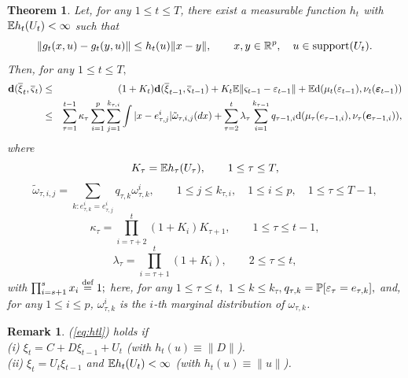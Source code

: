 \documentclass{article}              %
\newtheorem{theorem}{Theorem}
\newtheorem{remark}{Remark}
\begin{document}
\begin{theorem}
\label{prop:est} Let, for any $1\leq t\leq T$, there exist a measurable
function $h_{t}$ with $\E h_{t}(U_{t})<\infty$ such that 
\begin{equation}
\|g_{t}(x,u)-g_{t}(y,u)\|\leq h_{t}(u)\|x-y\|,\qquad
x,y\in\R^{p},\quad u\in\supp(U_{t}).\label{eq:htl}
\end{equation}
Then, for any $1\leq t\leq T,$ 
\begin{eqnarray}
\d(\barxi_{t},\barvs_{t}) & \leq & (1+K_{t})\d(\barxi_{t-1},\barvs_{t-1})+K_{t}\E\|\varsigma_{t-1}-\varepsilon_{t-1}\|+\E\dw(\mu_{t}(\varepsilon_{t-1}),\nu_{t}(\boldsymbol{\varepsilon}_{t-1}))\label{eq:dfirst}\\
 & \leq & \sum_{\tau=1}^{t-1}\kappa_{\tau}\sum_{i=1}^{p}\sum_{j=1}^{k_{\tau,i}}\int|x-e_{\tau,j}^{i}|\tilde{\omega}_{\tau,i,j}(dx)+\sum_{\tau=2}^{t}\lambda_{\tau}\sum_{i=1}^{k_{\tau-1}}q_{\tau-1,i}\dw(\mu_{\tau}(e_{\text{\ensuremath{\tau}}-1,i}),\nu_{\tau}(\boldsymbol{e}_{\tau-1,i})),\label{eq:dthird}
\end{eqnarray}
where
\[
K_{\tau}=\E h_\tau (U_{\tau}),\qquad1\leq\tau\leq T,
\]
\[
\tilde{\omega}_{\tau,i,j}=\sum_{k:e_{\tau,k}^{i}=e_{\tau,j}^{i}}q_{\tau,k}\omega_{\tau,k}^{i},\qquad1\leq j\leq k_{\tau,i},\quad 1\leq i\leq p, \quad 1\leq\tau\leq T-1,
\]
\[
\kappa_{\tau}=\prod_{i=\tau+2}^{t}(1+K_{i})K_{\tau+1},\qquad1\leq\tau\leq t-1,
\]
\[
\lambda_{\tau}=\prod_{i=\tau+1}^{t}(1+K_{i}),\qquad2\leq\tau\leq t,
\]
with $\prod_{i=s+1}^{s}x_{i}\defined1;$ here, \textup{\emph{for any
}}\textup{$1\leq\tau\leq t,$} $1\leq k\leq k_{\tau},$$q_{\tau,k}=\P[\varepsilon_{\tau}=e_{\tau,k}],$
and, for any $1\leq i\leq p$,\textup{\emph{ $\omega_{\tau,k}^{i}$
is the $i$-th marginal distribution of $\omega_{\tau,k}$. }}
\end{theorem}

\begin{remark}
(\ref{eq:htl}) holds if\\
(i) $\xi_{t}=C+D\xi_{t-1}+U_{t}$ (with $h_{t}(u)\equiv\|D\|$). \\
(ii) $\xi_{t}=U_{t}\xi{}_{t-1}$ and $\E h_t(U_t) < \infty$ (with $h_{t}(u)\equiv\|u\|$).
\end{remark}

\end{document}
